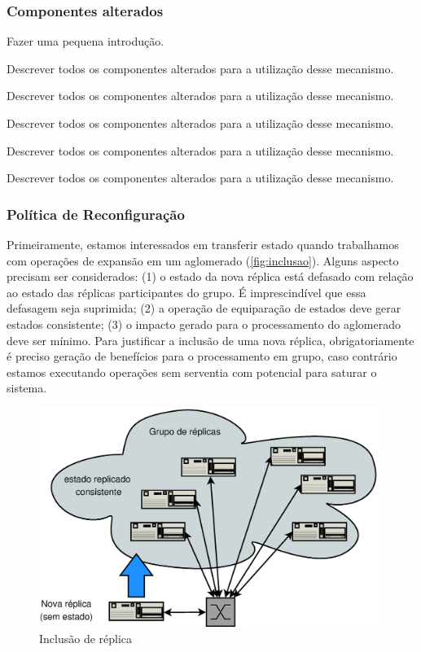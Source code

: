 \subsubsection{Componentes alterados}

Fazer uma pequena introdução.


Descrever todos os componentes alterados para a utilização desse mecanismo.


Descrever todos os componentes alterados para a utilização desse mecanismo.


Descrever todos os componentes alterados para a utilização desse mecanismo.


Descrever todos os componentes alterados para a utilização desse mecanismo.


Descrever todos os componentes alterados para a utilização desse mecanismo.

\subsubsection{Política de Reconfiguração}

Primeiramente, estamos interessados em transferir estado quando trabalhamos com operações
de expansão em um aglomerado (\autoref{fig:inclusao}). Alguns aspecto precisam ser
considerados: (1) o estado da nova réplica está defasado com relação ao estado das
réplicas participantes do grupo. É imprescindível que essa defasagem seja suprimida; (2) a
operação de equiparação de estados deve gerar estados consistente; (3) o impacto gerado
para o processamento do aglomerado deve ser mínimo. Para justificar a inclusão de uma nova
réplica, obrigatoriamente é preciso geração de benefícios para o processamento em grupo,
caso contrário estamos executando operações sem serventia com potencial para saturar o
sistema.

\begin{figure}[ht]
  \centering
  \includegraphics[width=11cm]{conteudo/capitulos/figuras/inclusao_replica_cluster.eps}
  \caption{Inclusão de réplica}
  \label{fig:inclusao}
\end{figure}

